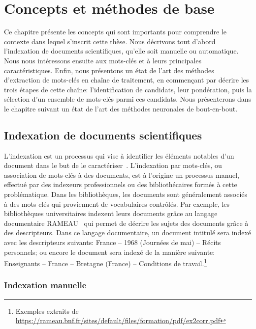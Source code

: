 \chapter{Concepts et méthodes de base}
\label{chap:concepts}

Ce chapitre présente les concepts qui sont importants pour comprendre le contexte dans lequel s'inscrit cette thèse.
Nous décrivons tout d'abord l'indexation de documents scientifiques, qu'elle soit manuelle ou automatique.
Nous nous intéressons ensuite aux mots-clés et à leurs principales caractéristiques.
Enfin, nous présentons un état de l'art des méthodes d'extraction de mots-clés en chaîne de traitement, en commençant par décrire les trois étapes de cette chaîne: l'identification de candidats, leur pondération, puis la sélection d'un ensemble de mots-clés parmi ces candidats. Nous présenterons dans le chapitre suivant un état de l'art des méthodes neuronales de bout-en-bout.



\section{Indexation de documents scientifiques}


L'indexation est un processus qui vise à identifier les éléments notables d'un document dans le but de le caractériser~\cite{khemiri_manual_2020}.
L'indexation par mots-clés, ou association de mots-clés à des documents, est à l'origine un processus manuel, effectué par des indexeurs professionnels ou des bibliothécaires formés à cette problématique.
Dans les bibliothèques, les documents sont généralement associés à des mots-clés qui proviennent de vocabulaires contrôlés.
Par exemple, les bibliothèques universitaires indexent leurs documents grâce au langage documentaire RAMEAU~\cite{centre_national_rameau_guide_2017} qui permet de décrire les sujets des documents grâce à des descripteurs.
Dans ce langage documentaire, un document intitulé  sera indexé avec les descripteurs suivants: France -- 1968 (Journées de mai) -- Récits personnels; ou encore le document  sera indexé de la manière suivante: Enseignants -- France -- Bretagne (France) -- Conditions de travail.\footnote{Exemples extraits de \url{https://rameau.bnf.fr/sites/default/files/formation/pdf/ex2corr.pdf}}

\subsection{Indexation manuelle}
\label{sub:concepts_indexation_manuelle}


